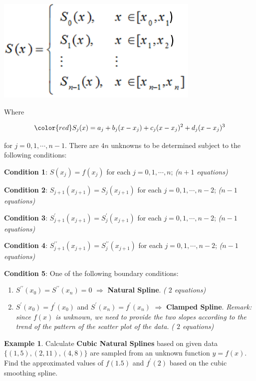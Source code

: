 \documentclass[
]{book}
\begin{document}
\begin{center}\includegraphics[width=0.25\linewidth]{img11/12-cubicSplineFun} \end{center}

Where

\[\color{red}
S_j(x) = a_j + b_j (x - x_j ) + c_j (x - x_j )^2 + d_j (x - x_j)^3
\]

for \(j = 0, 1, \cdots, n-1\). There are \(4n\) unknowns to be determined subject to the following conditions:

\textbf{\color{red} Condition 1}: \(S(x_j) = f(x_j)\) for each \(j = 0, 1,\cdots,n\); \emph{\color{red} (\(n+1\) equations)}

\textbf{\color{red} Condition 2}: \(S_{j+1}(x_{j+1}) = S_j(x_{j+1})\) for each \(j = 0, 1,\cdots,n-2\); \emph{\color{red} (\(n-1\) equations)}

\textbf{\color{red} Condition 3}: \(S^\prime_{j+1}(x_{j+1}) = S^\prime_j(x_{j+1})\) for each \(j = 0, 1,\cdots,n-2\); \emph{\color{red}(\(n-1\) equations)}

\textbf{\color{red} Condition 4}: \(S^{\prime\prime}_{j+1}(x_{j+1}) = S^{\prime\prime}_j(x_{j+1})\) for each \(j = 0, 1,\cdots,n-2\); \emph{\color{red} (\(n-1\) equations)}

\textbf{\color{red} Condition 5}: One of the following boundary conditions:

\begin{enumerate}
\def\labelenumi{\alph{enumi})}
\item
  \(S^{\prime\prime}(x_0) = S^{\prime\prime}(x_n) = 0\) \(\Rightarrow\) \textbf{Natural Spline}. \emph{\color{red} ( \(2\) equations)}
\item
  \(S^\prime(x_0) = f^\prime(x_0)\) and \(S^\prime(x_n) = f^\prime(x_n)\) \(\Rightarrow\) \textbf{Clamped Spline}. \emph{\color{blue} Remark: since \(f(x)\) is unknown, we need to provide the two slopes according to the trend of the pattern of the scatter plot of the data.} \emph{\color{red} ( \(2\) equations)}
\end{enumerate}

\hfill\break

\textbf{Example 1}. Calculate \textbf{\color{red} Cubic Natural Splines} based on given data \(\{(1, 5), (2, 11), (4, 8)\}\) are sampled from an unknown function \(y = f(x)\). Find the approximated values of \(f(1.5)\) and \(f^\prime(2)\) based on the cubic smoothing spline.
\end{document}
